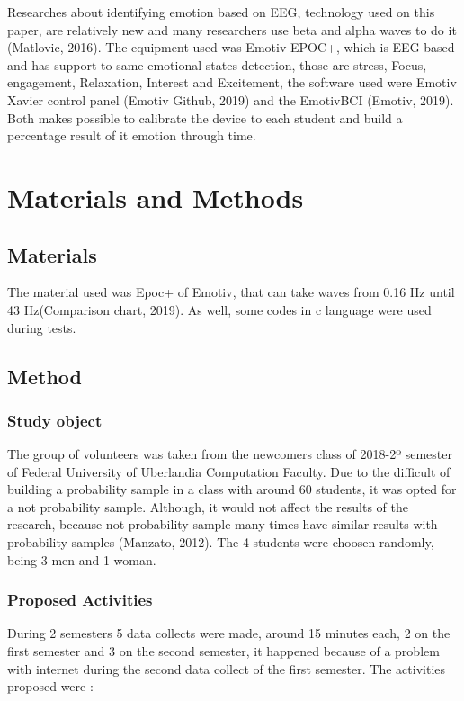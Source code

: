\documentclass[12pt,openright,a4paper]{article}
\begin{document}
Researches about identifying emotion based on EEG, technology used on this paper, are relatively  new and many researchers use beta and alpha waves to do it (Matlovic, 2016). The equipment used was Emotiv EPOC+,  which is EEG based and has support to same emotional states detection, those are stress, Focus, engagement, Relaxation, Interest and Excitement, the software used were Emotiv Xavier control panel (Emotiv Github, 2019) and the EmotivBCI (Emotiv, 2019). Both makes possible to calibrate the device to each student and build a percentage result of it emotion through time.
\section{Materials and Methods}

\subsection{Materials}

The material used was Epoc+ of Emotiv, that can take waves from 0.16 Hz until 43 Hz(Comparison chart, 2019). As well, some codes in c language were used during tests.

\subsection{Method}
 \subsubsection{Study object}
 The group of volunteers was taken from the newcomers class of 2018-2º semester of Federal University of Uberlandia Computation Faculty.  Due to the difficult of building a probability sample in a class with around 60 students, it was opted for a not probability sample. Although, it would not affect the results of the research, because not probability sample many times have similar results with probability samples (Manzato, 2012). The 4 students were choosen randomly, being 3 men and 1 woman.
 \subsubsection{Proposed Activities}
 During 2 semesters 5 data collects were made, around 15 minutes each, 2 on the first semester and 3  on the second semester, it happened because of a problem with internet during the second data collect of the first semester. The activities proposed were :
 
\end{document}
